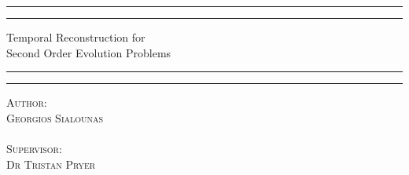 \documentclass[12pt,a4paper]{article}
\numberwithin{equation}{section}
\theoremstyle{definition}
\begin{document}
	\begin{titlepage} %
		\centering %
		\scshape %
		\rule{\textwidth}{1.6pt}\vspace*{-\baselineskip}\vspace*{2pt} %
		\rule{\textwidth}{0.4pt} %
		
		{\LARGE Temporal Reconstruction for  \\Second Order Evolution Problems\\} %
		
		\vspace{0.75\baselineskip} %
		
		\rule{\textwidth}{0.4pt}\vspace*{-\baselineskip}\vspace{3.2pt} %
		\rule{\textwidth}{1.6pt} %
		
		
		
		
		

		
		\vspace{0.5\baselineskip} %
		
		{\scshape\Large Author:\\ Georgios Sialounas \\$\,$\\ Supervisor: \\Dr Tristan Pryer} %
		

\end{titlepage}
\end{document}
